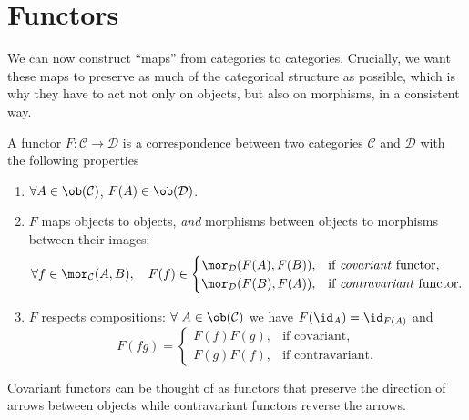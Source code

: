 \section{Functors}

We can now construct ``maps'' from categories to categories.
Crucially, we want these maps to preserve as much of the categorical
structure as possible, which is why they have to act not only on objects,
but also on morphisms, in a consistent way.
\begin{defn}[Functors]
    A functor $F:\mathcal{C}\rightarrow\mathcal{D}$ is a correspondence
    between two categories $\mathcal{C}$ and $\mathcal{D}$ with the
    following properties 
    \begin{enumerate}
        \item $\forall A\in\ob(\mathcal{C})$, $F(A)\in\ob(\mathcal{D})$.
        \item $F$ maps objects to objects, \emph{and} morphisms between objects to
        morphisms between their images:
        \begin{equation}
            \forall f\in\mor_{\mathcal{C}}(A,B),\quad F(f)\in\begin{cases}
            \mor_{\mathcal{D}}(F(A),F(B)), & \text{if \emph{covariant} functor},\\
            \mor_{\mathcal{D}}(F(B),F(A)), & \text{if \emph{contravariant} functor}.
            \end{cases}
        \end{equation}
        
        \item $F$ respects compositions: $\forall~A\in\ob(\mathcal{C})$ we have $F(\id_{A})=\id_{F(A)}$
        and
        \begin{equation}
            F(fg)=\begin{cases}
            F(f)F(g), & \text{if covariant},\\
            F(g)F(f), & \text{if contravariant}.
            \end{cases}
        \end{equation}
    \end{enumerate}
    Covariant functors can be thought of as functors that preserve the direction
    of arrows between objects while contravariant functors reverse the
    arrows.
\end{defn}

